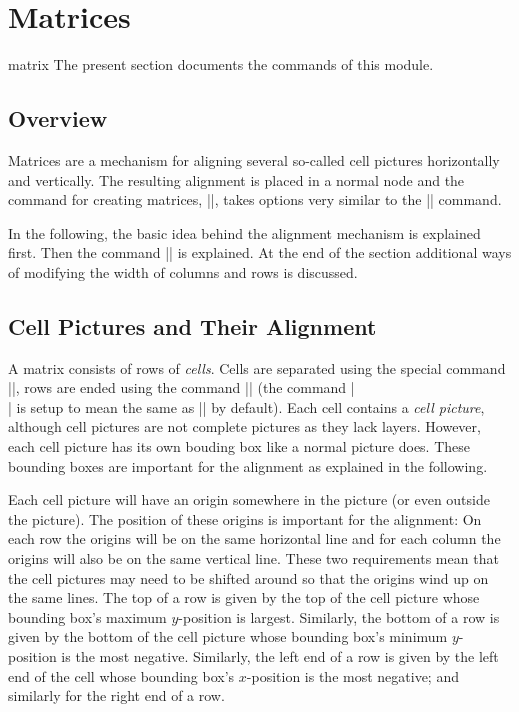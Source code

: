 %
%
%


\section{Matrices}

\label{section-base-matrices}

\begin{pgfmodule}{matrix}
  The present section documents the commands of this module.
\end{pgfmodule}

\subsection{Overview}

Matrices are a mechanism for aligning several so-called cell pictures 
horizontally and vertically. The resulting alignment is placed in a
normal node and the command for creating matrices, |\pgfmatrix|, takes
options very similar to the |\pgfnode| command.

In the following, the basic idea behind the alignment mechanism is
explained first. Then the command |\pgfmatrix| is explained. At the
end of the section additional ways of modifying the width of columns
and rows is discussed.


\subsection{Cell Pictures and Their Alignment}

A matrix consists of rows of \emph{cells}. Cells are separated using
the special command |\pgfmatrixnextcell|, rows are ended using the
command |\pgfmatrixendrow| (the command |\\| is setup to mean the same
as |\pgfmatrixendrow| by default). Each cell contains a \emph{cell
  picture}, although cell pictures are not complete pictures as they
lack layers. However, each cell picture has its own bouding box like a
normal picture does. These bounding boxes are important for the
alignment as explained in the following.

Each cell picture will have an origin somewhere in the picture (or
even outside the picture). The position of these origins is important
for the alignment: On each row the origins will be on the same
horizontal line and for each column the origins will also be on the
same vertical line. These two requirements mean that the cell pictures
may need to be shifted around so that the origins wind up on the same
lines. The top of a row is given by the top of the cell picture whose
bounding box's maximum $y$-position is largest. Similarly, the bottom
of a row is given by the bottom of the cell picture whose bounding
box's minimum $y$-position is the most negative. Similarly, the left
end of a row is given by the left end of the cell whose bounding box's
$x$-position is the most negative; and similarly for the right end of
a row.


